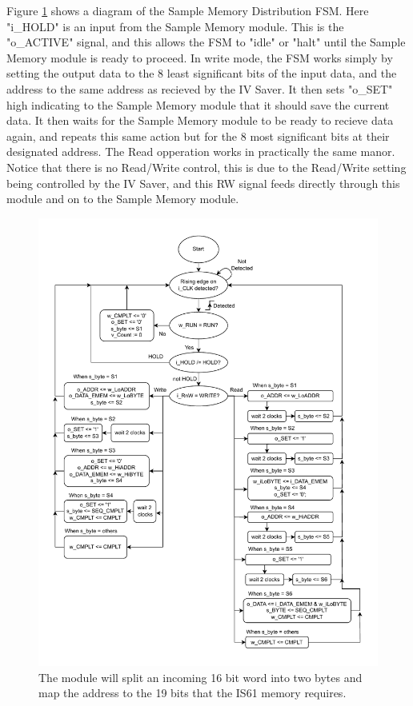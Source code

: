 Figure \ref{fig:7_2_6_MemDist} shows a diagram of the Sample Memory Distribution FSM. Here "i\_HOLD" is an input from the Sample Memory module. This is the "o\_ACTIVE" signal, and this allows the FSM to "idle" or "halt" until the Sample Memory module is ready to proceed. In write mode, the FSM works simply by setting the output data to the 8 least significant bits of the input data, and the address to the same address as recieved by the IV Saver. It then sets "o\_SET" high indicating to the Sample Memory module that it should save the current data. It then waits for the Sample Memory module to be ready to recieve data again, and repeats this same action but for the 8 most significant bits at their designated address. The Read opperation works in practically the same manor. Notice that there is no Read/Write control, this is due to the Read/Write setting being controlled by the IV Saver, and this RW signal feeds directly through this module and on to the Sample Memory module.

\begin{figure}[H]
    \centering
    \includegraphics[clip, trim=0 0 0 0, width=1\textwidth]{Sections/7_SystemDesign/Figures/MDIST_FSM.pdf}
    \caption{The module will split an incoming 16 bit word into two bytes and map the address to the 19 bits that the IS61 memory requires.}
    \label{fig:7_2_6_MemDist}
\end{figure}

